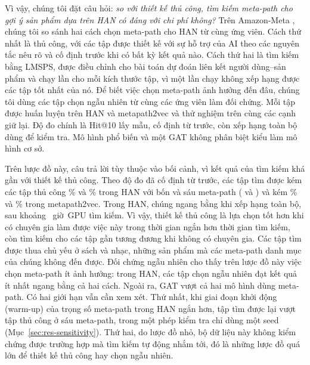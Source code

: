 Vì vậy, chúng tôi đặt câu hỏi: \emph{so với thiết kế thủ công, tìm kiếm meta-path cho gợi ý
sản phẩm dựa trên HAN có đáng với chi phí không?} Trên Amazon-Meta \citep{leskovec2007viral},
chúng tôi so sánh hai cách chọn meta-path cho HAN từ cùng  ứng viên.
Cách thứ nhất là thủ công, với các tập được thiết kế với sự hỗ trợ
của AI theo các nguyên tắc nêu rõ và cố định trước khi có bất kỳ kết quả nào. Cách thứ hai là tìm
kiếm bằng LMSPS, được điều chỉnh cho bài toán dự đoán liên kết người dùng--sản phẩm và chạy
 lần cho mỗi kích thước tập, vì một lần chạy không xếp hạng được các tập tốt nhất
của nó. Để biết việc chọn meta-path ảnh hưởng đến đâu, chúng tôi dùng các tập chọn ngẫu nhiên từ
cùng các ứng viên làm đối chứng. Mỗi tập được huấn luyện trên HAN và metapath2vec
\citep{dong2017metapath2vec} và thử nghiệm trên cùng các cạnh giữ lại. Độ đo chính là Hit@10 lấy
mẫu, cố định từ trước, còn xếp hạng toàn bộ dùng để kiểm tra. Mô hình phổ biến và một GAT không
phân biệt kiểu làm mô hình cơ sở.

Trên lược đồ này, câu trả lời tùy thuộc vào bối cảnh, vì kết quả của tìm kiếm khá gần với thiết kế thủ công.
Theo độ đo đã cố định từ trước, các tập tìm được kém các tập thủ công \% và
\% trong HAN với bốn và sáu meta-path ( và )
và kém \% và \% trong metapath2vec. Trong HAN, chúng ngang bằng
khi xếp hạng toàn bộ, sau khoảng ~giờ~GPU tìm kiếm. Vì vậy, thiết kế thủ công là lựa chọn
tốt hơn khi có chuyên gia làm được việc này trong thời gian ngắn hơn thời gian tìm kiếm, còn tìm kiếm cho
các tập gần tương đương khi không có chuyên gia. Các tập tìm được thua chủ yếu ở sách và nhạc, những sản phẩm
mà các meta-path danh mục của chúng không đến được. Đối chứng ngẫu nhiên cho thấy trên lược đồ này việc chọn
meta-path ít ảnh hưởng: trong HAN, các tập chọn ngẫu nhiên đạt kết quả ít nhất ngang bằng cả hai cách. Ngoài
ra, GAT vượt cả hai mô hình dùng meta-path. Có hai giới hạn vẫn cần xem xét. Thứ nhất, khi giai đoạn khởi động
(warm-up) của trọng số meta-path trong HAN ngắn hơn, tập tìm được lại vượt tập thủ công ở sáu meta-path, trong
một phép kiểm tra chỉ dùng một seed (Mục~\ref{sec:res-sensitivity}). Thứ hai, do lược đồ nhỏ, bộ dữ liệu này
không kiểm chứng được trường hợp mà tìm kiếm tự động nhắm tới, đó là những lược đồ quá lớn để thiết kế thủ công
hay chọn ngẫu nhiên.

